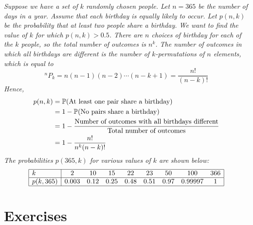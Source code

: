 \begin{solution}
\bit
\it Suppose we have a set of $k$ randomly chosen people.
\it Let $n=365$ be the number of days in a year. 
\it Assume that each birthday is equally likely to occur.
\eit
Let $p(n,k)$ be the probability that at least two people share a birthday.
\bit
\it We want to find the value of $k$ for which $p(n,k) > 0.5$.
\it There are $n$ choices of birthday for each of the $k$ people, so the total number of outcomes is $n^k$. 
\it The number of outcomes in which all birthdays are different is the number of $k$-permutations of $n$ elements, which is equal to 
\[
^nP_k = n(n-1)(n-2)\cdots(n-k+1) = \frac{n!}{(n-k)!}
\]
\eit
Hence,
\begin{align*}
p(n,k)
	& = \mathbb{P}(\text{At least one pair share a birthday}) \\
	& =  1 - \mathbb{P}(\text{No pairs share a birthday}) \\
	& =  1 - \frac{\text{Number of outcomes with all birthdays different}}{\text{Total number of outcomes}} \\
	& =  1 - \frac{n!}{n^k(n-k)!}
\end{align*}
The probabilities $p(365,k)$ for various values of $k$ are shown below:
\[
\begin{array}{|l|cccccccc|} \hline
k			& 2		& 10		& 15		& 22		& 23		& 50 	& 100		& 366 	\\ \hline
p(k,365)		& 0.003	& 0.12	& 0.25	& 0.48	& 0.51	& 0.97	& 0.99997 & 1		\\ \hline
\end{array}
\]
\end{solution}

\section{Exercises}


\endinput
